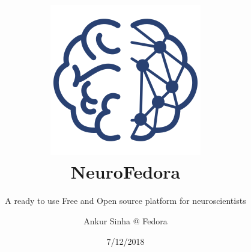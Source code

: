 
\usepackage{color}
\usepackage{tipa}
\usepackage{tikz}
\usepackage{jneurosci}
\usepackage{subfig}
\usepackage[T1]{fontenc}
\usepackage[utf8]{inputenc}
\usepackage[style=verbose,backend=biber,autocite=footnote]{biblatex}

\usepackage[default,osfigures,scale=0.95]{opensans}
\usepackage[normalem]{ulem}
\usepackage{hyperref}
\hypersetup{colorlinks,linkcolor=Green,urlcolor=links}
\usepackage{graphicx}
\usepackage{algorithmic}
\usepackage{textcomp}
\usepackage{wrapfig}
\usepackage{textgreek}
\usepackage{euler}



\title[NeuroFedora]{\includegraphics[keepaspectratio,width=.25\textwidth]{images/NeuroFedoraLogo01.png}\\NeuroFedora}
\subtitle{A ready to use Free and Open source platform for neuroscientists}
\author[Ankur Sinha]{Ankur Sinha @ Fedora}
\date[7/12/2018]{7/12/2018}



\begin{frame}
  \titlepage{}
\end{frame}


